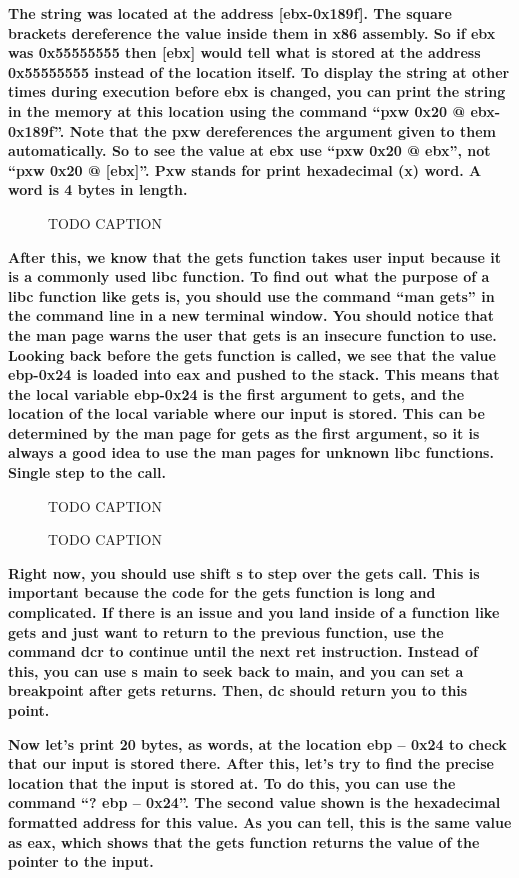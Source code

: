 \documentclass[letterpaper]{article}
\newcommand{\sitfig}[3]{
\begin{figure}[H]
\centering
\makebox[\textwidth][c]{
#2
}
\caption{#3}
\label{#1}
\end{figure}
}
\newcommand{\sitgfx}[4][scale=1.0]{
\sitfig{#3}{\texttt{[image: \#2]}}{#4}
}
\begin{document}
\textbf{The string was located at the address [ebx-0x189f]. The square brackets dereference the value inside them in x86
assembly. So if ebx was 0x55555555 then [ebx] would tell what is stored at the address 0x55555555 instead of the
location itself. To display the string at other times during execution before ebx is changed, you can print the string
in the memory at this location using the command ``pxw 0x20 @ ebx-0x189f''. Note that the pxw dereferences the argument
given to them automatically. So to see the value at ebx use ``pxw 0x20 @ ebx'', not ``pxw 0x20 @ [ebx]''. Pxw stands
for print hexadecimal (x) word. A word is 4 bytes in length. }

  
\sitgfx[width=6.5in,height=4.0626in]{FINALWORKINGDOCFORMERLYPRECURSOR-img058.png}{fig:unk}{TODO CAPTION}
 

\textbf{After this, we know that the gets function takes user input because it is a commonly used libc function. To find
out what the purpose of a libc function like gets is, you should use the command ``man gets'' in the command line in a
new terminal window. You should notice that the man page warns the user that gets is an insecure function to use.
Looking back before the gets function is called, we see that the value ebp-0x24 is loaded into eax and pushed to the
stack. This means that the local variable ebp-0x24 is the first argument to gets, and the location of the local
variable where our input is stored. This can be determined by the man page for gets as the first argument, so it is
always a good idea to use the man pages for unknown libc functions. Single step to the call.}

  
\sitgfx[width=6.5in,height=4.0626in]{FINALWORKINGDOCFORMERLYPRECURSOR-img059.png}{fig:unk}{TODO CAPTION}
 

  
\sitgfx[width=6.5in,height=4.0626in]{FINALWORKINGDOCFORMERLYPRECURSOR-img060.png}{fig:unk}{TODO CAPTION}
 

\textbf{Right now, you should use shift s to step over the gets call. This is important because the code for the gets
function is long and complicated. If there is an issue and you land inside of a function like gets and just want to
return to the previous function, use the command dcr to continue until the next ret instruction. Instead of this, you
can use s main to seek back to main, and you can set a breakpoint after gets returns. Then, dc should return you to
this point.}

\textbf{Now let's print 20 bytes, as words, at the location ebp -- 0x24 to check that our input is stored there. After
this, let's try to find the precise location that the input is stored at. To do this, you can use the command ``? ebp
-- 0x24''. The second value shown is the hexadecimal formatted address for this value. As you can tell, this is the
same value as eax, which shows that the gets function returns the value of the pointer to the input.}
\end{document}
